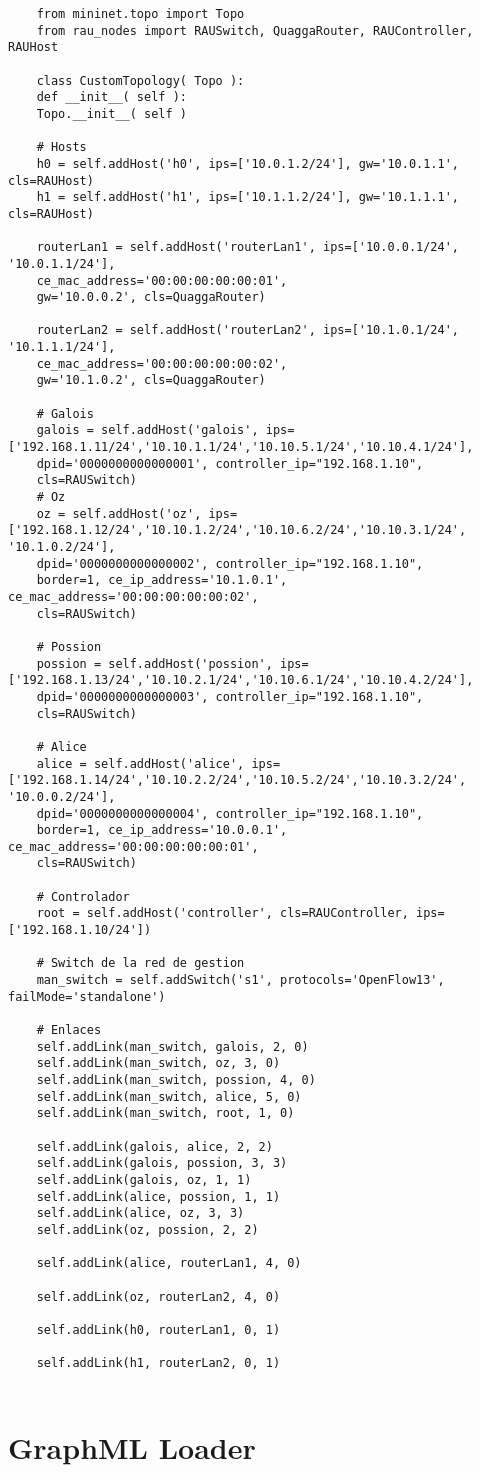 \begin{verbatim}
	from mininet.topo import Topo
	from rau_nodes import RAUSwitch, QuaggaRouter, RAUController, RAUHost
	
	class CustomTopology( Topo ):
	def __init__( self ):
	Topo.__init__( self )
	
	# Hosts
	h0 = self.addHost('h0', ips=['10.0.1.2/24'], gw='10.0.1.1', cls=RAUHost)
	h1 = self.addHost('h1', ips=['10.1.1.2/24'], gw='10.1.1.1', cls=RAUHost)
	
	routerLan1 = self.addHost('routerLan1', ips=['10.0.0.1/24', '10.0.1.1/24'],
	ce_mac_address='00:00:00:00:00:01',
	gw='10.0.0.2', cls=QuaggaRouter)
	
	routerLan2 = self.addHost('routerLan2', ips=['10.1.0.1/24', '10.1.1.1/24'],
	ce_mac_address='00:00:00:00:00:02',
	gw='10.1.0.2', cls=QuaggaRouter)
	
	# Galois
	galois = self.addHost('galois', ips=['192.168.1.11/24','10.10.1.1/24','10.10.5.1/24','10.10.4.1/24'],
	dpid='0000000000000001', controller_ip="192.168.1.10",
	cls=RAUSwitch)
	# Oz
	oz = self.addHost('oz', ips=['192.168.1.12/24','10.10.1.2/24','10.10.6.2/24','10.10.3.1/24', '10.1.0.2/24'],
	dpid='0000000000000002', controller_ip="192.168.1.10",
	border=1, ce_ip_address='10.1.0.1', ce_mac_address='00:00:00:00:00:02',
	cls=RAUSwitch)
	
	# Possion
	possion = self.addHost('possion', ips=['192.168.1.13/24','10.10.2.1/24','10.10.6.1/24','10.10.4.2/24'],
	dpid='0000000000000003', controller_ip="192.168.1.10",
	cls=RAUSwitch)
	
	# Alice
	alice = self.addHost('alice', ips=['192.168.1.14/24','10.10.2.2/24','10.10.5.2/24','10.10.3.2/24', '10.0.0.2/24'],
	dpid='0000000000000004', controller_ip="192.168.1.10",
	border=1, ce_ip_address='10.0.0.1', ce_mac_address='00:00:00:00:00:01',
	cls=RAUSwitch)
	
	# Controlador
	root = self.addHost('controller', cls=RAUController, ips=['192.168.1.10/24'])
	
	# Switch de la red de gestion
	man_switch = self.addSwitch('s1', protocols='OpenFlow13', failMode='standalone')
	
	# Enlaces
	self.addLink(man_switch, galois, 2, 0)
	self.addLink(man_switch, oz, 3, 0)
	self.addLink(man_switch, possion, 4, 0)
	self.addLink(man_switch, alice, 5, 0)
	self.addLink(man_switch, root, 1, 0)
	
	self.addLink(galois, alice, 2, 2)
	self.addLink(galois, possion, 3, 3)
	self.addLink(galois, oz, 1, 1)
	self.addLink(alice, possion, 1, 1)
	self.addLink(alice, oz, 3, 3)
	self.addLink(oz, possion, 2, 2)
	
	self.addLink(alice, routerLan1, 4, 0)
	
	self.addLink(oz, routerLan2, 4, 0)
	
	self.addLink(h0, routerLan1, 0, 1)
	
	self.addLink(h1, routerLan2, 0, 1)
	
\end{verbatim}


\section{GraphML Loader}

